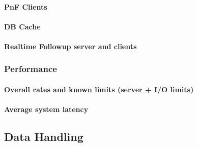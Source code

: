 \paragraph{PnF Clients}
\paragraph{DB Cache}
\paragraph{Realtime Followup server and clients}

\subsubsection{Performance}
\paragraph{Overall rates and known limits (server + I/O limits)}
\paragraph{Average system latency}


\subsection{Data Handling}